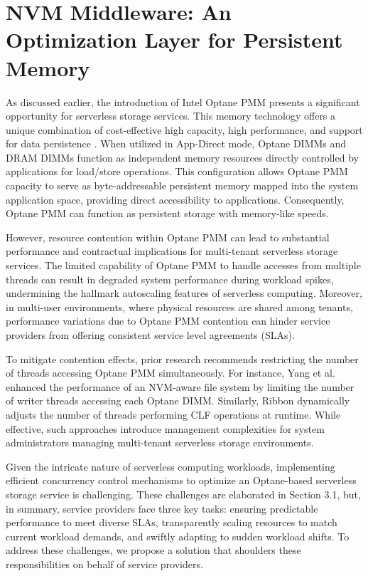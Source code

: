 \chapter[NVM Middleware: An Optimization Layer for Persistent Memory]{NVM Middleware: An Optimization Layer for Persistent Memory}

As discussed earlier, the introduction of Intel Optane PMM presents a significant opportunity for serverless storage services. This memory technology offers a unique combination of cost-effective high capacity, high performance, and support for data persistence \cite{IntelOp15:online}. When utilized in App-Direct mode, Optane DIMMs and DRAM DIMMs function as independent memory resources directly controlled by applications for load/store operations. This configuration allows Optane PMM capacity to serve as byte-addressable persistent memory mapped into the system application space, providing direct accessibility to applications. Consequently, Optane PMM can function as persistent storage with memory-like speeds.

However, resource contention within Optane PMM can lead to substantial performance and contractual implications for multi-tenant serverless storage services. The limited capability of Optane PMM to handle accesses from multiple threads can result in degraded system performance during workload spikes, undermining the hallmark autoscaling features of serverless computing. Moreover, in multi-user environments, where physical resources are shared among tenants, performance variations due to Optane PMM contention can hinder service providers from offering consistent service level agreements (SLAs).

To mitigate contention effects, prior research recommends restricting the number of threads accessing Optane PMM simultaneously. For instance, Yang et al. \cite{yang2020empirical} enhanced the performance of an NVM-aware file system by limiting the number of writer threads accessing each Optane DIMM. Similarly, Ribbon \cite{wu2020ribbon} dynamically adjusts the number of threads performing CLF operations at runtime. While effective, such approaches introduce management complexities for system administrators managing multi-tenant serverless storage environments.

Given the intricate nature of serverless computing workloads, implementing efficient concurrency control mechanisms to optimize an Optane-based serverless storage service is challenging. These challenges are elaborated in Section 3.1, but, in summary, service providers face three key tasks: ensuring predictable performance to meet diverse SLAs, transparently scaling resources to match current workload demands, and swiftly adapting to sudden workload shifts. To address these challenges, we propose a solution that shoulders these responsibilities on behalf of service providers.

